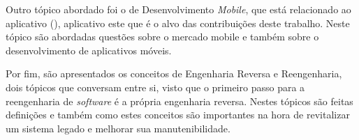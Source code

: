 Outro tópico abordado foi o de Desenvolvimento \textit{Mobile}, que está relacionado ao aplicativo  (\citeyear{MiaAjuda}), aplicativo este que é o 
alvo das contribuições deste trabalho. Neste tópico são abordadas questões sobre o mercado mobile e também sobre o desenvolvimento 
de aplicativos móveis.

Por fim, são apresentados os conceitos de Engenharia Reversa e Reengenharia, dois tópicos que conversam entre si, visto que o 
primeiro passo para a reengenharia de \textit{software} é a própria engenharia reversa. Nestes tópicos são feitas definições e também 
como estes conceitos são importantes na hora de revitalizar um sistema legado e melhorar sua manutenibilidade.
